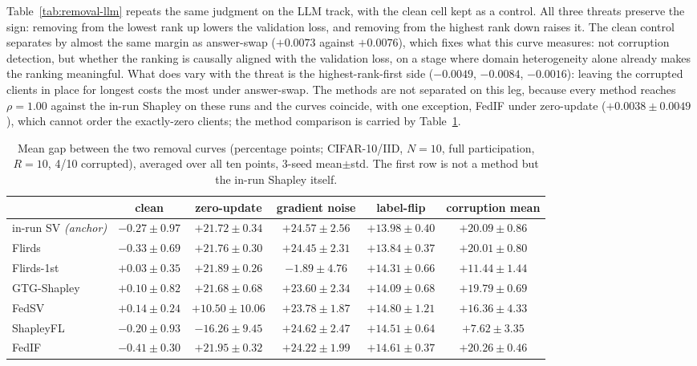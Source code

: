 \documentclass[letterpaper]{article} %
\theoremstyle{plain}
\begin{document}
Table~\ref{tab:removal-llm} repeats the same judgment on the LLM track, with
the clean cell kept as a control. All three threats preserve the sign:
removing from the lowest rank up lowers the validation loss, and removing
from the highest rank down raises it. The clean control separates by almost
the same margin as answer-swap ($+0.0073$ against $+0.0076$), which fixes
what this curve measures: not corruption detection, but whether the ranking
is causally aligned with the validation loss, on a stage where domain
heterogeneity alone already makes the ranking meaningful. What does vary
with the threat is the highest-rank-first side ($-0.0049$, $-0.0084$,
$-0.0016$): leaving the corrupted clients in place for longest costs the
most under answer-swap. The methods are not separated on this leg, because
every method reaches $\rho = 1.00$ against the in-run Shapley on these runs
and the curves coincide, with one exception, FedIF under zero-update
($+0.0038\pm0.0049$), which cannot order the exactly-zero clients; the
method comparison is carried by Table~\ref{tab:removal-cnn}.

\begin{table}[t]
\centering
\small
\caption{Mean gap between the two removal curves (percentage points;
CIFAR-10/IID, $N{=}10$, full participation, $R{=}10$, 4/10 corrupted),
averaged over all ten points, 3-seed mean$\pm$std. The first row is not a
method but the in-run Shapley itself.}
\label{tab:removal-cnn}
\begin{tabular}{lccccc}
\hline
 & clean & zero-update & gradient noise & label-flip & corruption mean \\
\hline
in-run SV \emph{(anchor)} & $-0.27\pm0.97$ & $+21.72\pm0.34$ & $+24.57\pm2.56$ & $+13.98\pm0.40$ & $+20.09\pm0.86$ \\
Flirds & $-0.33\pm0.69$ & $+21.76\pm0.30$ & $+24.45\pm2.31$ & $+13.84\pm0.37$ & $+20.01\pm0.80$ \\
Flirds-1st & $+0.03\pm0.35$ & $+21.89\pm0.26$ & $-1.89\pm4.76$ & $+14.31\pm0.66$ & $+11.44\pm1.44$ \\
GTG-Shapley & $+0.10\pm0.82$ & $+21.68\pm0.68$ & $+23.60\pm2.34$ & $+14.09\pm0.68$ & $+19.79\pm0.69$ \\
FedSV & $+0.14\pm0.24$ & $+10.50\pm10.06$ & $+23.78\pm1.87$ & $+14.80\pm1.21$ & $+16.36\pm4.33$ \\
ShapleyFL & $-0.20\pm0.93$ & $-16.26\pm9.45$ & $+24.62\pm2.47$ & $+14.51\pm0.64$ & $+7.62\pm3.35$ \\
FedIF & $-0.41\pm0.30$ & $+21.95\pm0.32$ & $+24.22\pm1.99$ & $+14.61\pm0.37$ & $+20.26\pm0.46$ \\
\hline
\end{tabular}
\end{table}
\end{document}
